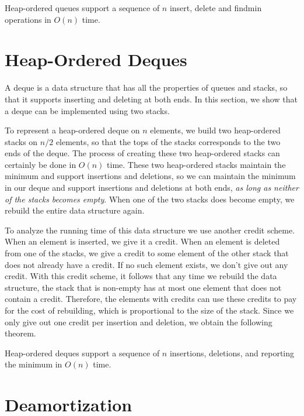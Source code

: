 \begin{thm}
Heap-ordered queues support a sequence of $n$ insert, delete and
findmin operations in $O(n)$ time.
\end{thm}

\section{Heap-Ordered Deques}

A deque is a data structure that has all the properties of queues and
stacks, so that it supports inserting and deleting at both ends.  In
this section, we show that a deque can be implemented using two
stacks.

To represent a heap-ordered deque on $n$ elements, we build two
heap-ordered stacks on $n/2$ elements, so that the tops of the stacks
corresponds to the two ends of the deque.  The process of creating
these two heap-ordered stacks can certainly be done in $O(n)$ time.
These two heap-ordered stacks maintain the minimum and support
insertions and deletions, so we can maintain the minimum in our deque
and support insertions and deletions at both ends, \emph{as long as
neither of the stacks becomes empty}.  When one of the two stacks
does become empty, we rebuild the entire data structure again.

To analyze the running time of this data structure we use another
credit scheme.  When an element is inserted, we give it a credit.
When an element is deleted from one of the stacks, we give a credit to
some element of the other stack that does not already have a credit.
If no such element exists, we don't give out any credit.  With this
credit scheme, it follows that any time we rebuild the data structure,
the stack that is non-empty has at most one element that does not
contain a credit.  Therefore, the elements with credits can use these
credits to pay for the cost of rebuilding, which is proportional to
the size of the stack.  Since we only give out one credit per insertion
and deletion, we obtain the following theorem.

\begin{thm}
Heap-ordered deques support a sequence of $n$ insertions, deletions,
and reporting the minimum in $O(n)$ time.
\end{thm}

\section{Deamortization}

